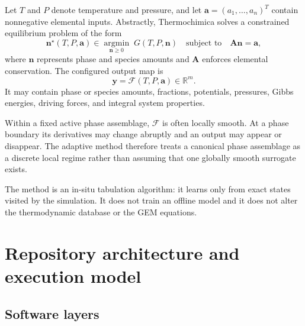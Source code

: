 \documentclass[11pt]{article}
\newcommand{\R}{\mathbb{R}}
\begin{document}
Let $T$ and $P$ denote temperature and pressure, and let
$\boldsymbol{a}=(a_1,\ldots,a_n)^T$ contain nonnegative elemental inputs.  Abstractly,
Thermochimica solves a constrained equilibrium problem of the form
\begin{equation}
  \boldsymbol{n}^{\star}(T,P,\boldsymbol{a})
  \in \underset{\boldsymbol{n}\geq 0}{\operatorname{argmin}}
  \;G(T,P,\boldsymbol{n})
  \quad\text{subject to}\quad
  \mathbf{A}\boldsymbol{n}=\boldsymbol{a},
  \label{eq:gem}
\end{equation}
where $\boldsymbol{n}$ represents phase and species amounts and $\mathbf{A}$ enforces elemental
conservation.  The configured output map is
\begin{equation}
  \boldsymbol{y}=\mathcal{F}(T,P,\boldsymbol{a})\in\R^m.
  \label{eq:map}
\end{equation}
It may contain phase or species amounts, fractions, potentials, pressures, Gibbs energies, driving
forces, and integral system properties.

Within a fixed active phase assemblage, $\mathcal{F}$ is often locally smooth.  At a phase
boundary its derivatives may change abruptly and an output may appear or disappear.  The adaptive
method therefore treats a canonical phase assemblage as a discrete local regime rather than
assuming that one globally smooth surrogate exists.

The method is an in-situ tabulation algorithm: it learns only from exact states visited by the
simulation.  It does not train an offline model and it does not alter the thermodynamic database or
the GEM equations.

\section{Repository architecture and execution model}

\subsection{Software layers}
\end{document}
